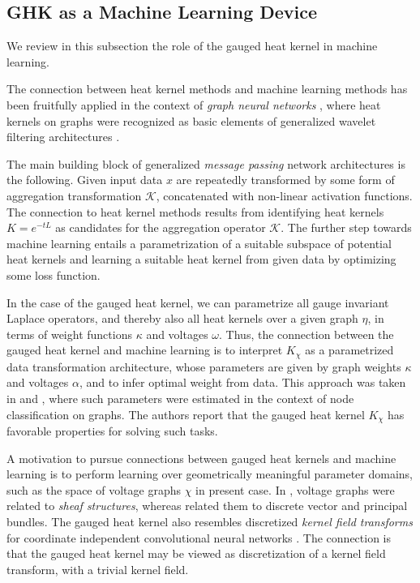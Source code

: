 \documentclass[10pt,reqno]{amsart}
\numberwithin{equation}{section}
\theoremstyle{bfnote}
\theoremstyle{bfdef}
\newcommand{\mc}[1]{\mathcal{#1}}
\providecommand\a; %
\renewcommand{\a}{\alpha}
\providecommand\hgen; %
\renewcommand{\hgen}{L}
\providecommand\vg; %
\renewcommand{\vg}{\chi}
\begin{document}
\subsection{GHK as a Machine Learning Device}





	We review in this subsection the role of the gauged heat kernel in machine learning.

	The connection between heat kernel methods and machine learning methods has been fruitfully applied in the context of \textit{graph neural networks} \cite{kipfSemiSupervisedClassificationGraph2017a,defferrardConvolutionalNeuralNetworks2017,bronstein2017geometric}, where heat kernels on graphs were recognized as basic elements of generalized wavelet filtering architectures \cite{chamberlain2021grand,chamberlain2021beltrami}.

	The main building block of generalized \textit{message passing} network architectures is the following. Given input data $x$ are repeatedly transformed by some form of aggregation transformation $\mc{K}$, concatenated with non-linear activation functions. The connection to heat kernel methods results from identifying heat kernels $K = e^{-t\hgen}$ as candidates for the aggregation operator $\mc{K}$. The further step towards machine learning entails a parametrization of a suitable subspace of potential heat kernels and learning a suitable heat kernel from given data by optimizing some loss function.

	In the case of the gauged heat kernel, we can parametrize all gauge invariant Laplace operators, and thereby also all heat kernels over a given graph $\eta$, in terms of weight functions $\kappa$ and voltages $\omega$.
	Thus, the connection between the gauged heat kernel and machine learning is to interpret $K_{\chi}$ as a parametrized data transformation architecture, whose parameters are given by graph weights $\kappa$ and voltages $\a$, and to infer optimal weight from data.
	This approach was taken in \cite{bodnarNeuralSheafDiffusion2023,bambergerBundleNeuralNetworks2024} and \cite{cassel2025bundle}, where such parameters were estimated in the context of node classification on graphs. The authors report that the gauged heat kernel $K_{\vg}$ has favorable properties for solving such tasks.

	A motivation to pursue connections between gauged heat kernels and machine learning is to perform learning over geometrically meaningful parameter domains, such as the space of voltage graphs $\chi$ in present case. In \cite{bodnarNeuralSheafDiffusion2023}, voltage graphs were related to \textit{sheaf structures}, whereas \cite{gaoGeometrySynchronizationProblems2019,bambergerBundleNeuralNetworks2024} related them to discrete vector and principal bundles. The gauged heat kernel also resembles discretized \textit{kernel field transforms} for coordinate independent convolutional neural networks \cite{weilerCoordinateIndependentConvolutional2021}. The connection is that the gauged heat kernel may be viewed as discretization of a kernel field transform, with a trivial kernel field.
\end{document}
